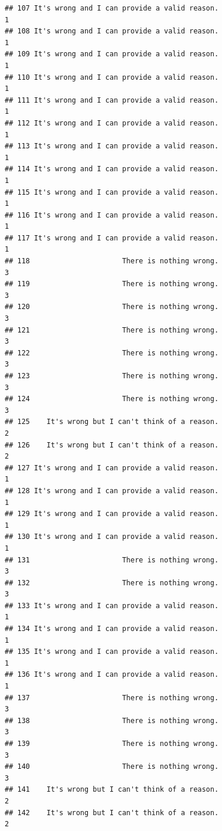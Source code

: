 \documentclass[
  american,
  man,floatsintext]{apa7}
\begin{document}
\begin{verbatim}
## 107 It's wrong and I can provide a valid reason.                    1
## 108 It's wrong and I can provide a valid reason.                    1
## 109 It's wrong and I can provide a valid reason.                    1
## 110 It's wrong and I can provide a valid reason.                    1
## 111 It's wrong and I can provide a valid reason.                    1
## 112 It's wrong and I can provide a valid reason.                    1
## 113 It's wrong and I can provide a valid reason.                    1
## 114 It's wrong and I can provide a valid reason.                    1
## 115 It's wrong and I can provide a valid reason.                    1
## 116 It's wrong and I can provide a valid reason.                    1
## 117 It's wrong and I can provide a valid reason.                    1
## 118                      There is nothing wrong.                    3
## 119                      There is nothing wrong.                    3
## 120                      There is nothing wrong.                    3
## 121                      There is nothing wrong.                    3
## 122                      There is nothing wrong.                    3
## 123                      There is nothing wrong.                    3
## 124                      There is nothing wrong.                    3
## 125    It's wrong but I can't think of a reason.                    2
## 126    It's wrong but I can't think of a reason.                    2
## 127 It's wrong and I can provide a valid reason.                    1
## 128 It's wrong and I can provide a valid reason.                    1
## 129 It's wrong and I can provide a valid reason.                    1
## 130 It's wrong and I can provide a valid reason.                    1
## 131                      There is nothing wrong.                    3
## 132                      There is nothing wrong.                    3
## 133 It's wrong and I can provide a valid reason.                    1
## 134 It's wrong and I can provide a valid reason.                    1
## 135 It's wrong and I can provide a valid reason.                    1
## 136 It's wrong and I can provide a valid reason.                    1
## 137                      There is nothing wrong.                    3
## 138                      There is nothing wrong.                    3
## 139                      There is nothing wrong.                    3
## 140                      There is nothing wrong.                    3
## 141    It's wrong but I can't think of a reason.                    2
## 142    It's wrong but I can't think of a reason.                    2

\end{verbatim}
\end{document}
